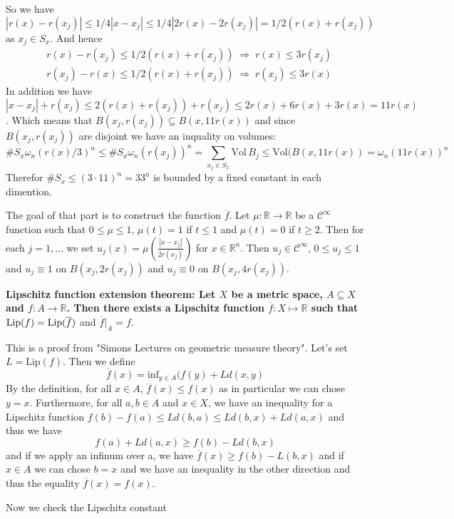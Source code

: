 \documentclass{article}
\begin{document}
So we have $|r(x)-r(x_j)| \leq 1/4|x-x_j|\leq1/4|2r(x)-2r(x_j)|=1/2(r(x)+r(x_j))$
as $x_j\in S_x$. And hence
\[
\begin{aligned}
    &r(x)-r(x_j)\leq1/2(r(x)+r(x_j))\;\Rightarrow\;r(x)\leq 3r(x_j)\\
    &r(x_j)-r(x)\leq1/2(r(x)+r(x_j))\;\Rightarrow\;r(x_j)\leq 3r(x)
\end{aligned}
\]
In addition we have $|x-x_j|+r(x_j)\leq2(r(x)+r(x_j))+r(x_j)\leq2r(x)+6r(x)+3r(x)=
11r(x)$. Which means that $B(x_j, r(x_j))\subseteq B(x, 11r(x))$ and since
$B(x_j, r(x_j))$ are disjoint we have an inquality on volumes:
\[
    \#S_x\omega_n(r(x)/3)^n\leq\#S_x\omega_n(r(x_j))^n=\sum_{x_j\in S_x}\text{Vol}
    \,B_j\leq\text{Vol}(B(x,11r(x))=\omega_n(11r(x))^n
\]
Therefor $\#S_x\leq(3\cdot11)^n=33^n$ is bounded by a fixed constant in each
dimention.

\vspace{1ex}
The goal of that part is to construct the function $\overline f$. Let $\mu:
\mathbb{R}\rightarrow\mathbb{R}$ be a $\mathcal{C}^\infty$ function such that
$0\leq\mu\leq1$, $\mu(t) = 1$ if $t\leq 1$ and $\mu(t)=0$ if $t\geq 2$. Then
for each $j=1,\ldots$ we set $u_j(x)=\mu\left(\frac{|x-x_j|}{2r(x_j)}\right)$
for $x\in\mathbb{R}^n$. Then $u_j\in\mathcal{C}^\infty$, $0\leq u_j\leq1$ and
$u_j\equiv 1$ on $B(x_j, 2r(x_j))$ and $u_j\equiv 0$ on $B(x_j, 4r(x_j))$. 


\vspace{2ex}
\textbf{Lipschitz function extension theorem: Let $X$ be a metric space,
$A\subseteq X$ and $f:A\rightarrow\mathbb{R}$. Then there exists a Lipschitz
function $\overline f:X\mapsto\mathbb{R}$ such that $\textnormal{Lip}(f)=\textnormal{Lip}
(\overline f)$} and $\overline f|_A=f$.

\vspace{1ex}
This is a proof from "Simons Lectures on geometric measure theory". Let's set
$L=\text{Lip}(f)$. Then we define
\[\overline f(x) = \text{inf}_{y\in A}(f(y)+Ld(x,y)\]
By the definition, for all $x\in A$, $\overline f(x)\leq f(x)$ as in particular
we can chose $y=x$.
Furthermore, for all $a,b\in A$ and $x\in X$, we have an inequality for a
Lipschitz function $f(b)-f(a)\leq Ld(b,a)\leq Ld(b,x)+Ld(a,x)$ and thus we have
\[ f(a)+Ld(a,x)\geq f(b)-Ld(b,x)\] 
and if we apply an infinum over a, we have $\overline f(x)\geq f(b)-L(b,x)$ and
if $x\in A$ we can chose $b=x$ and we have an inequality in the other direction
and thus the equality $\overline f(x)=f(x)$.

\vspace{1ex}
Now we check the Lipschitz constant
%
\end{document}
